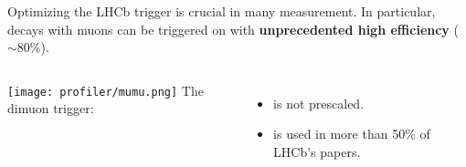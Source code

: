 \begin{frame}
Optimizing the LHCb trigger is crucial in many measurement. In particular,
decays with muons can be triggered on with \textbf{unprecedented high efficiency} ($\sim$80\%).
\begin{columns}[c]
\texttt{[image: profiler/mumu.png]}
The dimuon trigger:

\begin{itemize}
  \item is not prescaled.
  \item is used in more than 50\% of LHCb's papers.
\end{itemize}
\end{columns}
\end{frame}